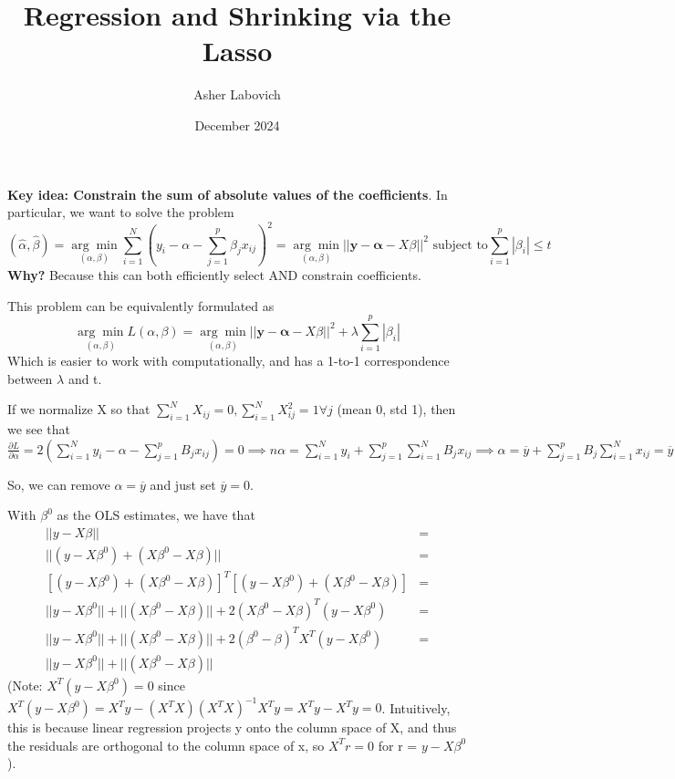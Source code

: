 \documentclass{article}
\title{Regression and Shrinking via the Lasso}
\author{Asher Labovich}
\date{December 2024}
\begin{document}
\maketitle 

\textbf{Key idea: Constrain the sum of absolute values of the coefficients}. 
In particular, we want to solve the problem \[
(\hat{\alpha}, \hat{\beta}) = \underset{(\alpha, \beta)}{\arg \min} \sum_{i=1}^N (y_i - \alpha - \sum_{j=1}^p \beta_j x_{ij})^2 = \underset{(\alpha, \beta)}{\arg \min} ||\mathbf{y} - \mathbf{\alpha} - X\beta||^2 \text{  subject to} \sum_{i=1}^p |\beta_i| \leq t 
\]
\textbf{Why?} Because this can both efficiently select AND constrain coefficients.

This problem can be equivalently formulated as \[
\underset{(\alpha, \beta)}{\arg \min} L(\alpha, \beta) = \underset{(\alpha, \beta)}{\arg \min} ||\mathbf{y} - \mathbf{\alpha} - X\beta||^2 + \lambda \sum_{i=1}^p |\beta_i|
\]
Which is easier to work with computationally, and has a 1-to-1 correspondence between $\lambda$ and t. 

If we normalize X so that $\sum_{i = 1}^N X_{ij} = 0, \sum_{i=1}^N X_{ij}^2 = 1 \forall j$ (mean 0, std 1), 
then we see that $\frac{\partial L}{\partial \alpha} = 2(\sum_{i=1}^N y_i - \alpha - \sum_{j=1}^p B_j x_{ij}) = 0 \implies 
n\alpha = \sum_{i=1}^N y_i + \sum_{j=1}^p \sum_{i=1}^N B_j x_{ij} \implies \alpha = \overline{y} +  \sum_{j=1}^p B_j \sum_{i=1}^N x_{ij} = \overline{y}$

So, we can remove $\alpha = \overline{y}$ and just set $\overline{y} = 0$.

With $\beta^0$ as the OLS estimates, we have that \begin{align*}
    ||y - X\beta|| &= \\
    ||(y - X\beta^0) + (X\beta^0 - X\beta)|| &= \\
    [(y - X\beta^0) + (X\beta^0 - X\beta)]^T[(y - X\beta^0) + (X\beta^0 - X\beta)] &= \\
    ||y - X\beta^0|| + ||(X\beta^0 - X\beta)|| + 2(X\beta^0 - X\beta)^T(y - X\beta^0) &= \\
    ||y - X\beta^0|| + ||(X\beta^0 - X\beta)|| + 2(\beta^0 - \beta)^TX^T(y - X\beta^0) &= \\
    ||y - X\beta^0|| + ||(X\beta^0 - X\beta)||
\end{align*}
(Note: $X^T(y - X\beta^0) = 0$ since $X^T(y - X\beta^0) = X^Ty - (X^TX)(X^TX)^{-1}X^Ty = X^Ty - X^Ty = 0$. Intuitively, this is because 
linear regression projects y onto the column space of X, and thus the residuals are orthogonal to the column space
of x, so $X^Tr = 0$ for r = $y - X\beta^0$).
\end{document}
